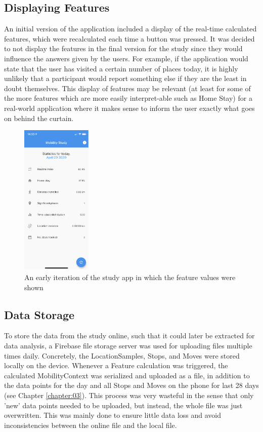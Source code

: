 \subsection{Displaying Features}
An initial version of the application included a display of the real-time calculated features, which were recalculated each time a button was pressed. It was decided to not display the features in the final version for the study since they would influence the answers given by the users. For example, if the application would state that the user has visited a certain number of places today, it is highly unlikely that a participant would report something else if they are the least in doubt themselves. This display of features may be relevant (at least for some of the more features which are more easily interpret-able such as Home Stay) for a real-world application where it makes sense to inform the user exactly what goes on behind the curtain.

\begin{figure}
    \centering
    \includegraphics[width=0.3\textwidth]{images/app_imgs/screens-features.pdf}
    \caption{An early iteration of the study app in which the feature values were shown}
    \label{fig:app-features-screen}
\end{figure}
\subsection{Data Storage}
To store the data from the study online, such that it could later be extracted for data analysis, a Firebase file storage server was used for uploading files multiple times daily. Concretely, the LocationSamples, Stops, and Moves were stored locally on the device. Whenever a Feature calculation was triggered, the calculated MobilityContext was serialized and uploaded as a file, in addition to the data points for the day and all Stops and Moves on the phone for last 28 days (see Chapter \ref{chapter:03}). This process was very wasteful in the sense that only 'new' data points needed to be uploaded, but instead, the whole file was just overwritten. This was mainly done to ensure little data loss and avoid inconsistencies between the online file and the local file.